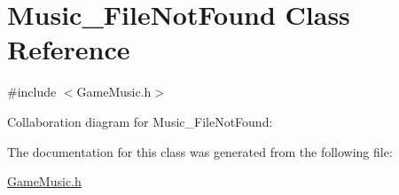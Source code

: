 \hypertarget{class_music___file_not_found}{}\section{Music\+\_\+\+File\+Not\+Found Class Reference}
\label{class_music___file_not_found}


{\ttfamily \#include $<$Game\+Music.\+h$>$}



Collaboration diagram for Music\+\_\+\+File\+Not\+Found\+:


The documentation for this class was generated from the following file\+:\begin{DoxyCompactItemize}
\item 
\hyperlink{_game_music_8h}{Game\+Music.\+h}\end{DoxyCompactItemize}
